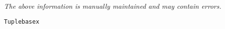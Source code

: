 \label{pkg:tuplebasex}

{\tiny \it The above information is manually maintained and may contain errors.}
\begin{verbatim}
Tuplebasex
\end{verbatim}
